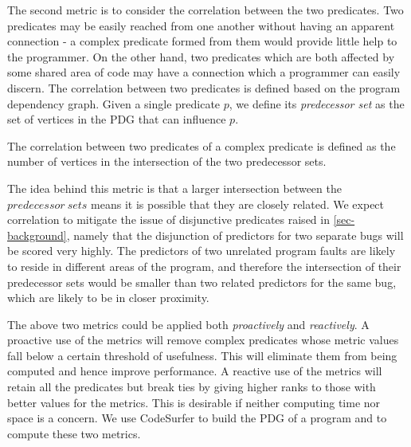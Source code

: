 The second metric is to consider the correlation between the two predicates.  Two predicates may be easily reached from one another without having an apparent connection - a complex predicate formed from them would provide little help to the programmer.  On the other hand, two predicates which are both affected by some shared area of code may have a connection which a programmer can easily discern.  The correlation between two predicates is defined based on the program dependency graph.  Given a single predicate $p$, we define its \textit{predecessor set} as the set of vertices in the PDG that can influence $p$.

\begin{defn}
\label{dfn5}
The correlation between two predicates of a complex predicate is defined as the number of vertices in the intersection of the two predecessor sets.
\end{defn}

The idea behind this metric is that a larger intersection between the $predecessor\ sets$ means it is possible that they are closely related.  We expect correlation to mitigate the issue of disjunctive predicates raised in \autoref{sec-background}, namely that the disjunction of predictors for two separate bugs will be scored very highly.  The predictors of two unrelated program faults are likely to reside in different areas of the program, and therefore the intersection of their predecessor sets would be smaller than two related predictors for the same bug, which are likely to be in closer proximity.

The above two metrics could be applied both \emph{proactively} and \emph{reactively}.  A proactive use of the metrics will remove complex predicates whose metric values fall below a certain threshold of usefulness.  This will eliminate them from being computed and hence improve performance.  A reactive use of the metrics will retain all the predicates but break ties by giving higher ranks to those with better values for the metrics. This is desirable if neither computing time nor space is a concern.  We use CodeSurfer to build the PDG of a program and to compute these two metrics.

